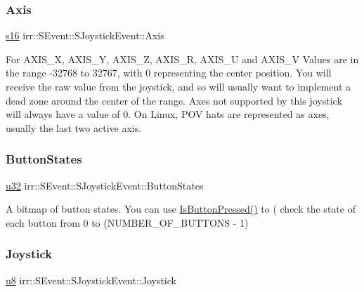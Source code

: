 \subsubsection{\texorpdfstring{Axis}{Axis}}
{\footnotesize\ttfamily \hyperlink{namespaceirr_a43ace0af066371ac0862bac3f7314220}{s16} irr\+::\+S\+Event\+::\+S\+Joystick\+Event\+::\+Axis}

For A\+X\+I\+S\+\_\+X, A\+X\+I\+S\+\_\+Y, A\+X\+I\+S\+\_\+Z, A\+X\+I\+S\+\_\+R, A\+X\+I\+S\+\_\+U and A\+X\+I\+S\+\_\+V Values are in the range -\/32768 to 32767, with 0 representing the center position. You will receive the raw value from the joystick, and so will usually want to implement a dead zone around the center of the range. Axes not supported by this joystick will always have a value of 0. On Linux, P\+OV hats are represented as axes, usually the last two active axis. \mbox{\label{structirr_1_1SEvent_1_1SJoystickEvent_a4fd74c22d62c1613405dc3191ccc5b7c}} 
\subsubsection{\texorpdfstring{Button\+States}{ButtonStates}}
{\footnotesize\ttfamily \hyperlink{namespaceirr_a0416a53257075833e7002efd0a18e804}{u32} irr\+::\+S\+Event\+::\+S\+Joystick\+Event\+::\+Button\+States}

A bitmap of button states. You can use \hyperlink{structirr_1_1SEvent_1_1SJoystickEvent_a618eae5c6218fc9d3b93e68038ca97f2}{Is\+Button\+Pressed()} to ( check the state of each button from 0 to (N\+U\+M\+B\+E\+R\+\_\+\+O\+F\+\_\+\+B\+U\+T\+T\+O\+NS -\/ 1) \mbox{\label{structirr_1_1SEvent_1_1SJoystickEvent_a04424b44a1c3370263afb3af501cae44}} 
\subsubsection{\texorpdfstring{Joystick}{Joystick}}
{\footnotesize\ttfamily \hyperlink{namespaceirr_a646874f69af8ff87fc10201b0254a761}{u8} irr\+::\+S\+Event\+::\+S\+Joystick\+Event\+::\+Joystick}



